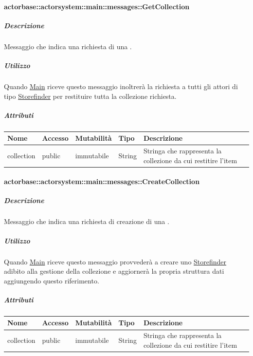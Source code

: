 \documentclass{scalatekids-article}
\begin{document}
\paragraph{actorbase::actorsystem::main::messages::GetCollection}
\label{sec:actorbase::actorsystem::main::messages::GetCollection}

\subparagraph{Descrizione}

Messaggio che indica una richiesta di una .

\subparagraph{Utilizzo}

Quando \hyperref[sec:actorbase::actorsystem::main::Main]{Main}
riceve questo messaggio inoltrerà la richiesta a tutti gli attori di
tipo \hyperref[sec:actorbase::actorsystem::storefinder::Storefinder]{Storefinder} per restituire tutta la collezione richiesta.

\subparagraph{Attributi}
\begin{tabular}{| p{3cm} | p{1.5cm} | p{2cm} | p{2cm} | p{8.5cm} |}
  \hline
  Nome & Accesso & Mutabilità & Tipo & Descrizione\\
  \hline
  collection & public & immutabile & String & Stringa che rappresenta la collezione da cui restitire l'item\\
  \hline
\end{tabular}

\paragraph{actorbase::actorsystem::main::messages::CreateCollection}
\label{sec:actorbase::actorsystem::main::messages::CreateCollection}

\subparagraph{Descrizione}
Messaggio che indica una richiesta di creazione di una .

\subparagraph{Utilizzo}
Quando \hyperref[sec:actorbase::actorsystem::main::Main]{Main}
riceve questo messaggio provvederà a creare uno \hyperref[sec:actorbase::actorsystem::storefinder::Storefinder]{Storefinder} adibito
alla gestione della collezione e aggiornerà la propria struttura dati
aggiungendo questo riferimento.

\subparagraph{Attributi}
\begin{tabular}{| p{3cm} | p{1.5cm} | p{2cm} | p{2cm} | p{8.5cm} |}
  \hline
  Nome & Accesso & Mutabilità & Tipo & Descrizione\\
  \hline
  collection & public & immutabile & String & Stringa che rappresenta la collezione da cui restitire l'item\\
  \hline
\end{tabular}
\end{document}
